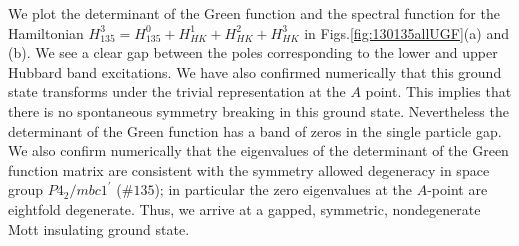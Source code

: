 \documentclass[prb,aps,amssymb,twocolumn,notitlepage]{revtex4-2}
\begin{document}
We plot the determinant of the Green function and the spectral function for the Hamiltonian $H^{3}_{135}=H^{0}_{135}+H^{1}_{HK}+H^{2}_{HK}+H^{3}_{HK}$ in Figs.\ref{fig:130135allUGF}(a) and (b). 
We see a clear gap between the poles corresponding to the lower and upper Hubbard band excitations. 
We have also confirmed numerically that this ground state transforms under the trivial representation at the $A$ point. 
This implies that there is no spontaneous symmetry breaking in this ground state. 
Nevertheless the determinant of the Green function has a band of zeros in the single particle gap. 
We also confirm numerically that the eigenvalues of the determinant of the Green function matrix are consistent with the symmetry allowed degeneracy in space group $P4_2/mbc1^\prime$ ($\#135$); in particular the zero eigenvalues at the $A$-point are eightfold degenerate. 
Thus, we arrive at a gapped, symmetric, nondegenerate Mott insulating ground state.
\end{document}
